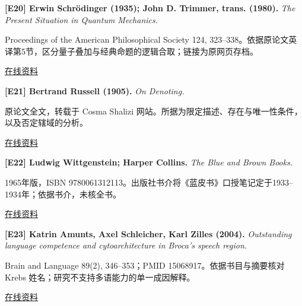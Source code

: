 \par\noindent\begin{minipage}{\linewidth}
\label{ref-20}\noindent\textbf{[E20] Erwin Schrödinger (1935); John D. Trimmer, trans. (1980).} \textit{The Present Situation in Quantum Mechanics.}\par\nobreak
Proceedings of the American Philosophical Society 124, 323–338。依据原论文英译第5节，区分量子叠加与经典命题的逻辑合取；链接为原网页存档。\par
{\small\href{https://web.archive.org/web/20161020061333/https://www.tuhh.de/rzt/rzt/it/QM/cat.html}{在线资料}}\par
\par\end{minipage}\par

\par\noindent\begin{minipage}{\linewidth}
\label{ref-21}\noindent\textbf{[E21] Bertrand Russell (1905).} \textit{On Denoting.}\par\nobreak
原论文全文，转载于 Cosma Shalizi 网站。所据为限定描述、存在与唯一性条件，以及否定辖域的分析。\par
{\small\href{https://bactra.org/Russell/denoting/}{在线资料}}\par
\par\end{minipage}\par

\par\noindent\begin{minipage}{\linewidth}
\label{ref-22}\noindent\textbf{[E22] Ludwig Wittgenstein; Harper Collins.} \textit{The Blue and Brown Books.}\par\nobreak
1965年版，ISBN 9780061312113。出版社书介将《蓝皮书》口授笔记定于1933–1934年；依据书介，未核全书。\par
{\small\href{https://books.google.com/books/about/The_Blue_and_Brown_Books.html?id=R7CxDSdN6mcC}{在线资料}}\par
\par\end{minipage}\par

\par\noindent\begin{minipage}{\linewidth}
\label{ref-23}\noindent\textbf{[E23] Katrin Amunts, Axel Schleicher, Karl Zilles (2004).} \textit{Outstanding language competence and cytoarchitecture in Broca’s speech region.}\par\nobreak
Brain and Language 89(2), 346–353；PMID 15068917。依据书目与摘要核对 Krebs 姓名；研究不支持多语能力的单一成因解释。\par
{\small\href{https://pubmed.ncbi.nlm.nih.gov/15068917/}{在线资料}}\par
\par\end{minipage}\par

